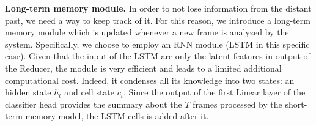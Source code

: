 \noindent\textbf{Long-term memory module.}
In order to not lose information from the distant past, we need a way to keep track of it.
For this reason, we introduce a long-term memory module  which is updated whenever a new frame is analyzed by the system.
Specifically, we choose to employ an RNN module (LSTM \cite{lstm,gru} in this specific case).
Given that the input of the LSTM  are only the latent features in output of the Reducer, the module is very efficient and leads to a limited additional computational cost.
Indeed, it condenses all its knowledge into two states: an hidden state $h_t$ and cell state $c_t$.
Since the output of the first Linear layer of the classifier head provides the summary about the $T$ frames processed by the short-term memory model, the LSTM cells is added after it.


